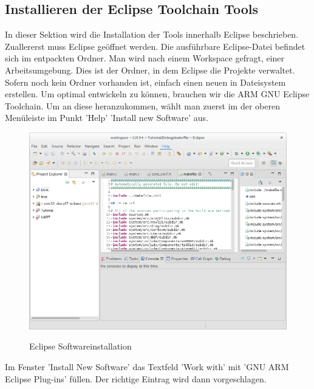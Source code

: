 \subsection{Installieren der Eclipse Toolchain Tools}
In dieser Sektion wird die Installation der Tools innerhalb Eclipse beschrieben.
Zuallererst muss Eclipse geöffnet werden. Die ausführbare Eclipse-Datei befindet sich im entpackten Ordner.
Man wird nach einem Workspace gefragt, einer Arbeitsumgebung. Dies ist der Ordner, in dem Eclipse die Projekte verwaltet. Sofern noch kein Ordner vorhanden ist, einfach einen neuen in Dateisystem erstellen.
Um optimal entwickeln zu können, brauchen wir die ARM GNU Eclipse Toolchain. Um an diese heranzukommen, wählt man zuerst im der oberen Menüleiste im Punkt 'Help' 'Install new Software' aus.
\begin{figure}[h]
\begin{center}
\includegraphics[width=12cm]{grafiken/debugger/EclipseNewSoftware.png}
\label{eclipse_softwareinstallation}
\caption{Eclipse Softwareinstallation}
\end{center}
\end{figure}
Im Fenster 'Install New Software' das Textfeld 'Work with' mit 'GNU ARM Eclipse Plug-ins' füllen. Der richtige Eintrag wird dann vorgeschlagen.
